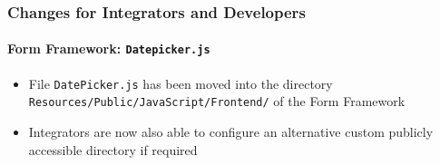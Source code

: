 %

\begin{frame}[fragile]
	\frametitle{Changes for Integrators and Developers}
	\framesubtitle{Form Framework: \texttt{Datepicker.js}}


	\begin{itemize}
		\item File \texttt{DatePicker.js} has been moved into the directory
			\texttt{Resources/Public/JavaScript/Frontend/} of the Form Framework
		\item Integrators are now also able to configure an alternative custom
			publicly accessible directory if required
	\end{itemize}

\end{frame}

